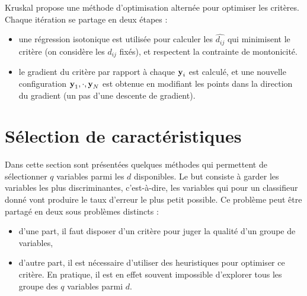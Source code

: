 Kruskal propose une m\'ethode d'optimisation altern\'ee
pour optimiser les crit\`eres. Chaque it\'eration
se partage en deux \'etapes :
\begin{itemize}
\item une r\'egression isotonique est utilis\'ee pour calculer les
$\hat{d_{ij}}$ qui minimisent le crit\`ere (on consid\`ere les $d_{ij}$ fix\'es),
et respectent la contrainte de montonicit\'e.
\item le gradient du crit\`ere par rapport \`a chaque $\mbox{\bf y}_i$ est calcul\'e,
et une nouvelle configuration $\mbox{\bf y}_1, \cdot, \mbox{\bf y}_N$ est obtenue en modifiant
les points dans la direction du gradient (un pas d'une descente de gradient).
\end{itemize}

\section{S\'election de caract\'eristiques}

Dans cette section sont pr\'esent\'ees quelques m\'ethodes qui permettent
de s\'electionner $q$ variables parmi les  $d$ disponibles. Le but
consiste \`a garder les variables les plus discriminantes, c'est-\`a-dire,
les variables qui pour un classifieur donn\'e vont produire le taux
d'erreur le plus petit possible. Ce probl\`eme peut \^etre partag\'e
en deux sous probl\`emes distincts :
\begin{itemize}
\item
d'une part, il faut disposer d'un crit\`ere pour juger la
qualit\'e d'un groupe de variables,
\item
d'autre part, il est n\'ecessaire d'utiliser des heuristiques
pour optimiser ce crit\`ere. En pratique, il est en effet souvent
impossible d'explorer tous les groupe des $q$ variables parmi $d$. 
\end{itemize}

